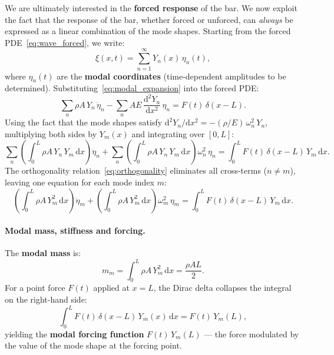 We are ultimately interested in the \textbf{forced response} of the bar.  We
now exploit the fact that the response of the bar, whether forced or unforced,
can \emph{always} be expressed as a linear combination of the mode shapes.
Starting from the forced PDE~\eqref{eq:wave_forced}, we write:
\begin{equation}
  \xi(x,t) = \sum_{n=1}^{\infty} Y_{n}(x)\,\eta_{n}(t),
  \label{eq:modal_expansion}
\end{equation}
where $\eta_{n}(t)$ are the \textbf{modal coordinates} (time-dependent
amplitudes to be determined).  Substituting~\eqref{eq:modal_expansion} into
the forced PDE:
\begin{equation}
  \sum_{n} \rho A\,Y_{n}\,\ddot{\eta}_{n}
  - \sum_{n} AE\,\frac{\mathrm{d}^{2}Y_{n}}{\mathrm{d}x^{2}}\,\eta_{n}
  = F(t)\,\delta(x - L).
\end{equation}
Using the fact that the mode shapes satisfy $\mathrm{d}^{2}Y_{n}/\mathrm{d}x^{2}
= -(\rho/E)\,\omega_{n}^{2}\,Y_{n}$, multiplying both sides by $Y_{m}(x)$ and
integrating over $[0,L]$:
\begin{equation}
  \sum_{n}
    \left(\int_{0}^{L} \rho A\,Y_{n}\,Y_{m}\,\mathrm{d}x\right)\ddot{\eta}_{n}
  + \sum_{n}
    \left(\int_{0}^{L} \rho A\,Y_{n}\,Y_{m}\,\mathrm{d}x\right)\omega_{n}^{2}\,\eta_{n}
  = \int_{0}^{L} F(t)\,\delta(x-L)\,Y_{m}\,\mathrm{d}x.
\end{equation}
The orthogonality relation~\eqref{eq:orthogonality} eliminates all cross-terms
($n \neq m$), leaving one equation for each mode index $m$:
\begin{equation}
  \left(\int_{0}^{L} \rho A\,Y_{m}^{2}\,\mathrm{d}x\right)\ddot{\eta}_{m}
  + \left(\int_{0}^{L} \rho A\,Y_{m}^{2}\,\mathrm{d}x\right)\omega_{m}^{2}\,\eta_{m}
  = \int_{0}^{L} F(t)\,\delta(x-L)\,Y_{m}\,\mathrm{d}x.
\end{equation}

\paragraph{Modal mass, stiffness and forcing.}
The \textbf{modal mass} is:
\begin{equation}
  m_{m} = \int_{0}^{L} \rho A\,Y_{m}^{2}\,\mathrm{d}x = \frac{\rho A L}{2}.
  \label{eq:modal_mass}
\end{equation}
For a point force $F(t)$ applied at $x=L$, the Dirac delta collapses the
integral on the right-hand side:
\begin{equation}
  \int_{0}^{L} F(t)\,\delta(x - L)\,Y_{m}(x)\,\mathrm{d}x
  = F(t)\,Y_{m}(L),
\end{equation}
yielding the \textbf{modal forcing function} $F(t)\,Y_{m}(L)$ --- the force
modulated by the value of the mode shape at the forcing point.

